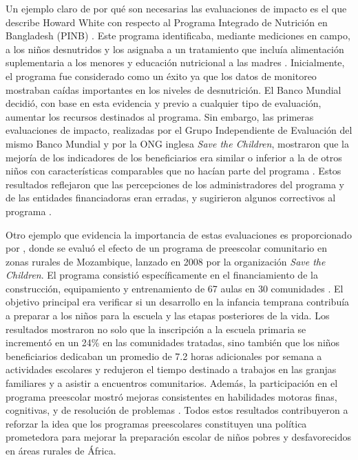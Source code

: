 \documentclass[../../main.tex]{subfiles}
\begin{document}
Un ejemplo claro de por qué son necesarias las evaluaciones de impacto es el que describe
Howard White con respecto al Programa Integrado de Nutrición en Bangladesh (PINB)
\cite{white2009theory}. Este programa identificaba, mediante mediciones en campo, a los
niños desnutridos y los asignaba a un tratamiento que incluía alimentación suplementaria a
los menores y educación nutricional a las madres \cite{bernal}. Inicialmente, el programa
fue considerado como un éxito ya que los datos de monitoreo mostraban caídas importantes
en los niveles de desnutrición. El Banco Mundial decidió, con base en esta evidencia y
previo a cualquier tipo de evaluación, aumentar los recursos destinados al programa. Sin
embargo, las primeras evaluaciones de impacto, realizadas por el Grupo Independiente de
Evaluación del mismo Banco Mundial y por la ONG inglesa \textit{Save the Children},
mostraron que la mejoría de los indicadores de los beneficiarios era similar o inferior a
la de otros niños con características comparables que no hacían parte del programa
\cite{bernal}. Estos resultados reflejaron que las percepciones de los administradores del
programa y de las entidades financiadoras eran erradas, y sugirieron algunos correctivos
al programa \cite{bernal}.

Otro ejemplo que evidencia la importancia de estas evaluaciones es proporcionado por
\cite{preschool-africa-2012}, donde se evaluó el efecto de un programa de preescolar
comunitario en zonas rurales de Mozambique, lanzado en 2008 por la organización \textit{Save the
Children}. El programa consistió específicamente en el financiamiento de la construcción,
equipamiento y entrenamiento de 67 aulas en 30 comunidades \cite{preschool-africa-2012}. El
objetivo principal era verificar si un desarrollo en la infancia temprana contribuía a
preparar a los niños para la escuela y las etapas posteriores de la vida. Los resultados
mostraron no solo que la inscripción a la escuela primaria se incrementó en un 24\% en las
comunidades tratadas, sino también que los niños beneficiarios dedicaban un promedio de
7.2 horas adicionales por semana a actividades escolares y redujeron el tiempo destinado a
trabajos en las granjas familiares y a asistir a encuentros comunitarios. Además, la
participación en el programa preescolar mostró mejoras consistentes en habilidades motoras
finas, cognitivas, y de resolución de problemas \cite{preschool-africa-2012}. Todos estos
resultados contribuyeron a reforzar la idea que los programas preescolares constituyen
una política prometedora para mejorar la preparación escolar de niños pobres y
desfavorecidos en áreas rurales de África.
\end{document}
